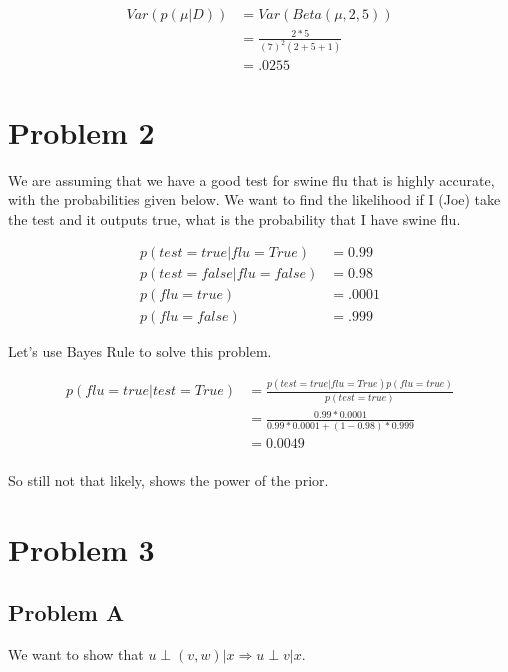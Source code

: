 \documentclass[paper=a4, fontsize=11pt]{scrartcl} %
\begin{document}
\begin{align}
Var(p(\mu|D)) &=  Var(Beta(\mu,2,5)) \\
&= \frac{2*5}{(7)^2(2+5+1)} \\
&= .0255
\end{align}


\section{Problem 2}
We are assuming that we have a good test for swine flu that is highly accurate, with the probabilities given below.  
We want to find the likelihood if I (Joe) take the test and it outputs true, what is the probability that I have swine flu.

\begin{align}
p(test=true|flu=True) &= 0.99 \\
p(test=false|flu=false) &= 0.98 \\
p(flu=true) &= .0001 \\
p(flu=false) &= .999
\end{align}

Let's use Bayes Rule to solve this problem.

\begin{align}
p(flu=true|test=True) &= \frac{p(test=true|flu=True) p(flu=true)}{p(test=true)} \\
&= \frac{0.99*0.0001}{0.99*0.0001+(1-0.98)*0.999} \\
&= 0.0049 \\
\end{align}


So still not that likely, shows the power of the prior.

\section{Problem 3}

\subsection{Problem A}
We want to show that $u \perp (v,w)|x \Rightarrow u \perp v|x$.
\end{document}
